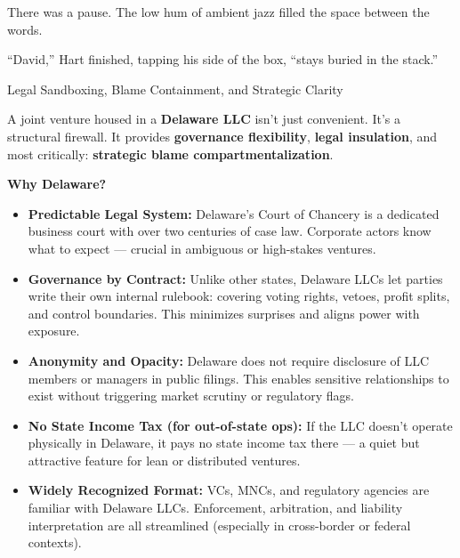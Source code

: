 There was a pause. The low hum of ambient jazz filled the space between the words.

``David,'' Hart finished, tapping his side of the box, ``stays buried in the stack.''

\medskip

\begin{TechnicalSidebar}{Legal Sandboxing, Blame Containment, and Strategic Clarity}

  A joint venture housed in a \textbf{Delaware LLC} isn’t just convenient. It’s a structural firewall.  
  It provides \textbf{governance flexibility}, \textbf{legal insulation}, and most critically: \textbf{strategic blame 
  compartmentalization}.
  
  \medskip
  
  \textbf{Why Delaware?}

  \medskip
  
  \begin{itemize}
    \item \textbf{Predictable Legal System:}  
    Delaware’s Court of Chancery is a dedicated business court with over two centuries of case law. Corporate actors 
    know what to expect — crucial in ambiguous or high-stakes ventures.
  
    \item \textbf{Governance by Contract:}  
    Unlike other states, Delaware LLCs let parties write their own internal rulebook: covering voting rights, vetoes, 
    profit splits, and control boundaries. This minimizes surprises and aligns power with exposure.
  
    \item \textbf{Anonymity and Opacity:}  
    Delaware does not require disclosure of LLC members or managers in public filings. This enables sensitive relationships 
    to exist without triggering market scrutiny or regulatory flags.
  
    \item \textbf{No State Income Tax (for out-of-state ops):}  
    If the LLC doesn’t operate physically in Delaware, it pays no state income tax there — a quiet but attractive feature 
    for lean or distributed ventures.
  
    \item \textbf{Widely Recognized Format:}  
    VCs, MNCs, and regulatory agencies are familiar with Delaware LLCs. Enforcement, arbitration, and liability 
    interpretation are all streamlined (especially in cross-border or federal contexts).
  \end{itemize}
  

\end{TechnicalSidebar}
